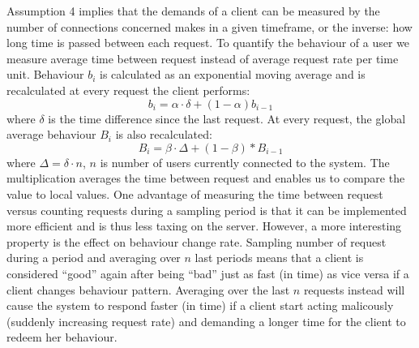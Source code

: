 Assumption 4 implies that the demands of a client can be measured by the number of connections concerned makes in a given timeframe, or the inverse: how long time is passed between each request. 
To quantify the behaviour of a user we measure average time between request instead of average request rate per time unit. Behaviour $b_i$ is calculated as an exponential moving average and is recalculated at every request the client performs:
 $$ b_{i} = \alpha\cdot\delta + (1-\alpha)b_{i-1} $$
where $\delta$ is the time difference since the last request. At every request, the global average behaviour $B_i$ is also recalculated:
$$ B_{i} = \beta\cdot\Delta + (1-\beta)*B_{i-1} $$
where $\Delta = \delta \cdot n$, $n$ is number of users currently connected to the system. The multiplication averages the time between request and enables us to compare the value to local values. 
One advantage of measuring the time between request versus counting requests during a sampling period is that it can be implemented more efficient and is thus less taxing on the server. However, a more interesting property is the effect on behaviour change rate. Sampling number of request during a period and averaging over $n$ last periods means that a client is considered ``good'' again after being ``bad'' just as fast (in time) as vice versa if a client changes behaviour pattern.
Averaging over the last $n$ requests instead will cause the system to respond faster (in time) if a client start acting malicously (suddenly increasing request rate) and demanding a longer time for the client to redeem her behaviour.




